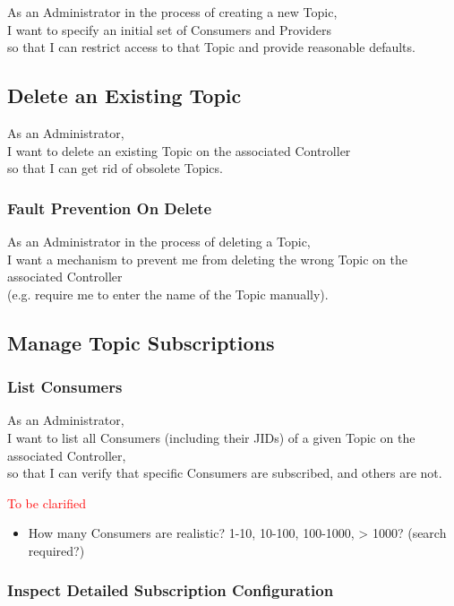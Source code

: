 As an Administrator in the process of creating a new Topic,\\
I want to specify an initial set of Consumers and Providers \\
so that I can restrict access to that Topic and provide reasonable defaults.

\subsection{Delete an Existing Topic}

As an Administrator,\\
I want to delete an existing Topic on the associated Controller\\
so that I can get rid of obsolete Topics.

\subsubsection{Fault Prevention On Delete}

As an Administrator in the process of deleting a Topic, \\
I want a mechanism to prevent me from deleting the wrong Topic on the associated Controller\\
(e.g. require me to enter the name of the Topic manually).

\subsection{Manage Topic Subscriptions}

\subsubsection{List Consumers}

As an Administrator, \\
I want to list all Consumers (including their JIDs) of a given Topic on the associated Controller, \\
so that I can verify that specific Consumers are subscribed, and others are not.

\noindent\textcolor{red}{To be clarified}

\begin{itemize}
    \item How many Consumers are realistic? 1-10, 10-100, 100-1000, > 1000? (search required?)
\end{itemize}


\subsubsection{Inspect Detailed Subscription Configuration}

